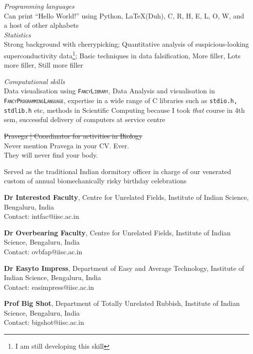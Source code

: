 \documentclass{article}
\begin{document}
\begin{addmargin}[0.75in]{0.75in}
	\reversemarginpar
	\noindent
	\emph{Programming languages\\}
	Can print ``Hello World!'' using Python, \LaTeX (Duh), C, R, H, E, L, O, W, and a host of other alphabets\\
	
	\noindent
	\emph{Statistics\\}
	Strong background with cherrypicking; Quantitative analysis of suspicious-looking superconductivity data\footnote{I am still developing this skill}; Basic techniques in data falsification, More filler, Lots more filler, Still more filler

	\noindent
	\emph{Computational skills\\}
	Data visualisation using \textsc{\texttt{FancyLibrary}}, Data Analysis and visualisation in \texttt{\textsc{FancyProgrammingLanguage}}, expertise in a wide range of C libraries such as \texttt{stdio.h, stdlib.h} etc, methods in Scientific Computing because I took \emph{that} course in 4th sem, successful delivery of computers at service centre\\

\end{addmargin}
\begin{addmargin}[0.75in]{0.75in}
	\reversemarginpar
	\noindent
	\st{Pravega | Coordinator for activities in Biology}\normalmarginpar {}\\Never mention Pravega in your CV. Ever.\\They will never find your body.

	\normalmarginpar
	
	\noindent
	Served as the traditional Indian dormitory officer in charge of our venerated custom of annual biomechanically risky birthday celebrations\\

\end{addmargin}
\begin{addmargin}[0.75in]{0.75in}
	\reversemarginpar
	\noindent
	\textbf{Dr Interested Faculty}, Centre for Unrelated Fields, Institute of Indian Science, Bengaluru, India\\Contact: intfac@iisc.ac.in

	\noindent
	\textbf{Dr Overbearing Faculty},  Centre for Unrelated Fields, Institute of Indian Science, Bengaluru, India\\Contact: ovbfap@iisc.ac.in
	
	\noindent
	\textbf{Dr Easyto Impress}, Department of Easy and Average Technology, Institute of Indian Science, Bengaluru, India\\Contact: easimpress@iisc.ac.in

	\noindent
	\textbf{Prof Big Shot}, Department of Totally Unrelated Rubbish, Institute of Indian Science, Bengaluru, India\\Contact: bigshot@iisc.ac.in

\end{addmargin}
\end{document}
